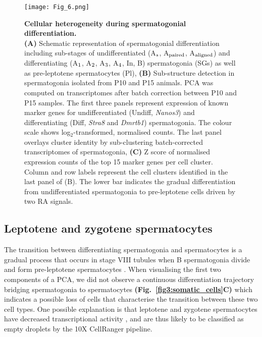 \begin{figure}[!h]
\centering
\texttt{[image: Fig\_6.png]}
\caption[Cellular heterogeneity during spermatogonial differentiation]{\textbf{Cellular heterogeneity during spermatogonial differentiation.}\\
\textbf{(A)} Schematic representation of spermatogonial differentiation including sub-stages of undifferentiated (A$_\textnormal{s}$, A$_\textnormal{paired}$, A$_\textnormal{aligned}$) and differentiating (A$_\textnormal{1}$, A$_\textnormal{2}$, A$_\textnormal{3}$, A$_\textnormal{4}$, In, B) spermatogonia (SGs) as well as pre-leptotene spermatocytes (Pl), 
\textbf{(B)} Sub-structure detection in spermatogonia isolated from P10 and P15 animals. PCA was computed on transcriptomes after batch correction between P10 and P15 samples. The first three panels represent expression of known marker genes for undifferentiated (Undiff, \textit{Nanos3}) and differentiating (Diff, \textit{Stra8} and \textit{Dmrtb1}) spermatogonia. 
The colour scale shows log$_2$-transformed, normalised counts. The last panel overlays cluster identity by sub-clustering batch-corrected transcriptomes of spermatogonia, 
\textbf{(C)} Z score of normalised expression counts of the top 15 marker genes per cell cluster. Column and row labels represent the cell clusters identified in the last panel of (B). 
The lower bar indicates the gradual differentiation from undifferentiated spermatogonia to pre-leptotene cells driven by two \gls{RA} signals. }
\label{fig3:spermatogonia}
\end{figure}

\newpage

\subsection{Leptotene and zygotene spermatocytes}

The transition between differentiating spermatogonia and spermatocytes is a gradual process that occurs in stage VIII tubules when B spermatogonia divide and form pre-leptotene spermatocytes \citep{Anderson2008, Baltus2006}. 
When visualising the first two components of a PCA, we did not observe a continuous differentiation trajectory bridging spermatogonia to spermatocytes \textbf{(Fig.~\ref{fig3:somatic_cells}C)} which indicates a possible loss of cells that characterise the transition between these two cell types. One possible explanation is that leptotene and zygotene spermatocytes have decreased transcriptional activity \citep{Kierszenbaum1974, Monesi1965}, and are thus likely to be classified as empty droplets by the 10X CellRanger pipeline. \\

